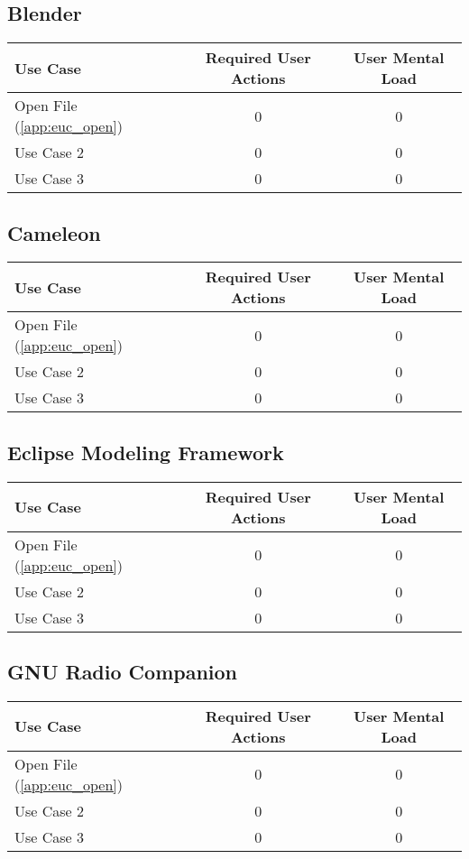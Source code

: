 \subsection{Blender}

\begin{tabularx}{\textwidth}{Xcc}
\textbf{Use Case} & \textbf{Required User Actions} & \textbf{User Mental Load}\\
\hline
Open File (\ref{app:euc_open}) & 0 & 0 \\
Use Case 2                     & 0 & 0 \\
Use Case 3                     & 0 & 0
\end{tabularx}

\subsection{Cameleon}

\begin{tabularx}{\textwidth}{Xcc}
\textbf{Use Case} & \textbf{Required User Actions} & \textbf{User Mental Load}\\
\hline
Open File (\ref{app:euc_open}) & 0 & 0 \\
Use Case 2                     & 0 & 0 \\
Use Case 3                     & 0 & 0
\end{tabularx}

\subsection{Eclipse Modeling Framework}

\begin{tabularx}{\textwidth}{Xcc}
\textbf{Use Case} & \textbf{Required User Actions} & \textbf{User Mental Load}\\
\hline
Open File (\ref{app:euc_open}) & 0 & 0 \\
Use Case 2                     & 0 & 0 \\
Use Case 3                     & 0 & 0
\end{tabularx}

\subsection{GNU Radio Companion}

\begin{tabularx}{\textwidth}{Xcc}
\textbf{Use Case} & \textbf{Required User Actions} & \textbf{User Mental Load}\\
\hline
Open File (\ref{app:euc_open}) & 0 & 0 \\
Use Case 2                     & 0 & 0 \\
Use Case 3                     & 0 & 0
\end{tabularx}

